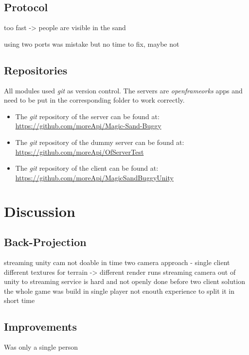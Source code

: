 \documentclass[12pt,a4paper,twoside,titlepage,headsepline,numbers=noenddot,listof=totoc,index=totoc,bibliography=totoc]{scrartcl}
\theoremstyle{break}
\begin{document}
\subsection{Protocol}
\label{ch:protocol}


too fast -> people are visible in the sand



using two ports was mistake but no time to fix,
maybe not

\subsection{Repositories}
All modules used \textit{git} as version control. The servers are \textit{openframeorks} apps and need to be put in the corresponding folder to work correctly.

\begin{itemize}
	\item The \textit{git} repository of the server can be found at:\\ \url{https://github.com/moreApi/Magic-Sand-Buggy}
	\item The \textit{git} repository of the dummy server can be found at:\\ \url{https://github.com/moreApi/OfServerTest}
	\item The \textit{git} repository of the client can be found at:\\ \url{https://github.com/moreApi/MagicSandBuggyUnity}
\end{itemize}

\section{Discussion}

\subsection{Back-Projection}
\label{ch:backProjection}
streaming unity cam not doable in time
two camera approach - single client
different textures for terrain -> different render runs
streaming camera out of unity to streaming service is hard and not openly done before
two client solution
the whole game was build in single player
not enouth experience to split it in short time

\subsection{Improvements}
Was only a single person
\end{document}
